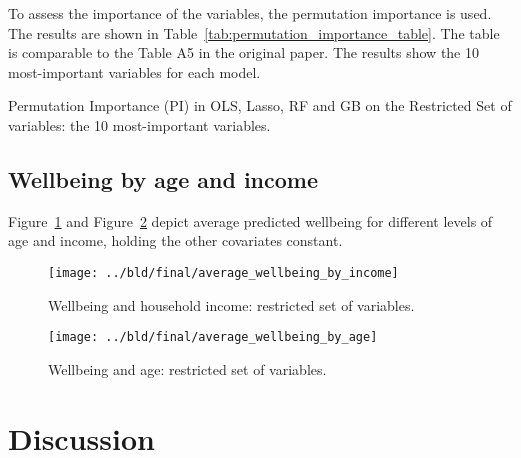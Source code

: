 \documentclass[11pt, a4paper, leqno]{article}
\begin{document}
To assess the importance of the variables, the permutation importance is used. The results are
shown in Table~\ref{tab:permutation_importance_table}. The table is comparable to the Table A5 in
the original paper. The results show the 10 most-important variables for each model.


\begin{table}[htbp]
    \centering
    
    \caption{Permutation Importance (PI) in OLS, Lasso, RF and GB on the Restricted Set of variables: the 10 most-important variables.}
    \label{tab:permutation_importance_table}
\end{table}


\subsection{Wellbeing by age and income}

Figure~\ref{fig:average_wellbeing_by_income} and Figure~\ref{fig:average_wellbeing_by_age} depict
average predicted wellbeing for different levels of age and income, holding the other covariates
constant.

\begin{figure}[htbp]
    \centering
    \texttt{[image: ../bld/final/average\_wellbeing\_by\_income]}
    \caption{Wellbeing and household income: restricted set of variables.}
    \label{fig:average_wellbeing_by_income}
\end{figure}

\begin{figure}[htbp]
    \centering
    \texttt{[image: ../bld/final/average\_wellbeing\_by\_age]}
    \caption{Wellbeing and age: restricted set of variables.}
    \label{fig:average_wellbeing_by_age}
\end{figure}



\section{Discussion} %
\label{sec:discussion}





\printbibliography
{}



\end{document}
